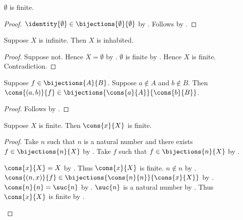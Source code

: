 \begin{classification}\label{emptyset_is_finite}
    $\emptyset$ is finite.
\end{classification}
\begin{proof}
    $\identity{\emptyset}\in\bijections{\emptyset}{\emptyset}$
        by .
    Follows by .
\end{proof}

\begin{proposition}\label{infinite_is_inhabited}
    Suppose $X$ is infinite.
    Then $X$ is inhabited.
\end{proposition}
\begin{proof}
    Suppose not.
    Hence $X=\emptyset$ by .
    $\emptyset$ is finite by .
    Hence $X$ is finite.
    Contradiction.
\end{proof}

\begin{proposition}\label{bijection_cons}
    Suppose $f\in\bijections{A}{B}$.
    Suppose $a\notin A$ and $b\notin B$.
    Then $\cons{(a,b)}{f}\in\bijections{\cons{a}{A}}{\cons{b}{B}}$.
\end{proposition}
\begin{proof}
    Follows by .
\end{proof}

\begin{proposition}\label{finite_cons}
    Suppose $X$ is finite.
    Then $\cons{x}{X}$ is finite.
\end{proposition}
\begin{proof}
    Take $n$ such that $n$ is a natural number and
        there exists $f\in\bijections{n}{X}$ by .
    Take $f$ such that $f\in\bijections{n}{X}$ by \auto.
    \begin{byCase}
        $\cons{x}{X}=X$ by .
        Thus $\cons{x}{X}$ is finite.
        $n\notin n$ by .
        $\cons{(n,x)}{f}\in\bijections{\cons{n}{n}}{\cons{x}{X}}$
            by .
        $\cons{n}{n}=\suc{n}$ by .
        $\suc{n}$ is a natural number by .
        Thus $\cons{x}{X}$ is finite by .
    \end{byCase}
\end{proof}

